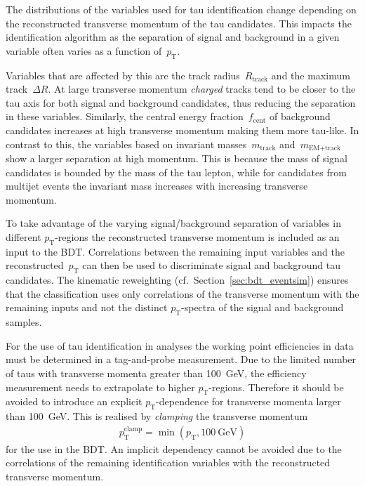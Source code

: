 The distributions of the variables used for tau identification change depending
on the reconstructed transverse momentum of the tau candidates. This impacts the
identification algorithm as the separation of signal and background in a given
variable often varies as a function of~$p_\text{T}$.

Variables that are affected by this are the track radius~$R_\text{track}$ and
the maximum track~$\Delta R$. At large transverse momentum \emph{charged} tracks
tend to be closer to the tau axis for both signal and background candidates,
thus reducing the separation in these variables. Similarly, the central energy
fraction~$f_\text{cent}$ of background candidates increases at high transverse
momentum making them more tau-like. In contrast to this, the variables based on
invariant masses~$m_\text{track}$ and~$m_\text{EM+track}$ show a larger
separation at high momentum. This is because the mass of signal candidates is
bounded by the mass of the tau lepton, while for candidates from multijet events
the invariant mass increases with increasing transverse momentum. 

To take advantage of the varying signal/background separation of variables in
different $p_\text{T}$-regions the reconstructed transverse momentum is included
as an input to the BDT. Correlations between the remaining input variables and
the reconstructed~$p_\text{T}$ can then be used to discriminate signal and
background tau candidates. The kinematic reweighting (cf.\
Section~\ref{sec:bdt_eventsim}) ensures that the classification uses only
correlations of the transverse momentum with the remaining inputs and not the
distinct $p_\text{T}$-spectra of the signal and background samples.

For the use of tau identification in analyses the working point efficiencies in
data must be determined in a tag-and-probe measurement. Due to the limited
number of taus with transverse momenta greater than \SI{100}{\GeV}, the
efficiency measurement needs to extrapolate to higher $p_\text{T}$-regions.
Therefore it should be avoided to introduce an explicit $p_\text{T}$-dependence
for transverse momenta larger than \SI{100}{\GeV}. This is realised by
\emph{clamping} the transverse momentum
\begin{align*}
  p_\text{T}^\text{clamp} = \min(p_\text{T}, \SI{100}{\giga\electronvolt})
\end{align*}
for the use in the BDT. An implicit dependency cannot be avoided due to the
correlations of the remaining identification variables with the reconstructed
transverse momentum.

